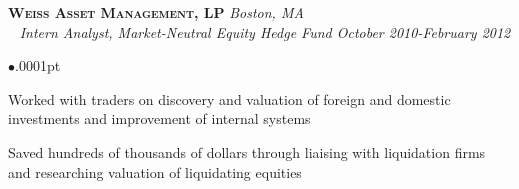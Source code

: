 \documentclass[11pt]{article}
\newcommand{\employer}[4]{{\hspace*{-20pt} {\small{\textbf{\textsc{ #1}}}}
  \hfill \small{\emph{#2}}\\ ~\hspace*{-20pt} \small \emph{ #3 \hfill #4}}\\ }
\newenvironment{achievements}{\begin{list}{$\bullet$}{\topsep .0001pt \itemsep -2pt}}{\vspace*{5pt}\end{list} }
\begin{document}

\employer{Weiss Asset Management, LP} {Boston, MA} {Intern Analyst, Market-Neutral Equity Hedge Fund} {October 2010-February 2012}
	\begin{achievements}
	\item Worked with traders on discovery and valuation of foreign and domestic investments and improvement of internal systems
	\item Saved hundreds of thousands of dollars through liaising with liquidation firms and researching valuation of liquidating equities 
	\end{achievements}
	

\end{document}
